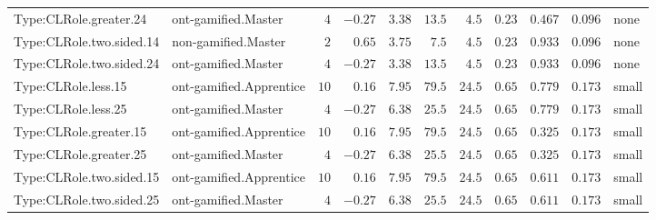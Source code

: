 \documentclass[6pt,a4paper]{article}
\begin{document}
{\begin{longtable}{llrrrrrrrrl}
Type:CLRole.greater.24&ont-gamified.Master&$ 4$&$-0.27$&$ 3.38$&$ 13.5$&$ 4.5$&$0.23$&$0.467$&$0.096$&none\tabularnewline
Type:CLRole.two.sided.14&non-gamified.Master&$ 2$&$ 0.65$&$ 3.75$&$  7.5$&$ 4.5$&$0.23$&$0.933$&$0.096$&none\tabularnewline
Type:CLRole.two.sided.24&ont-gamified.Master&$ 4$&$-0.27$&$ 3.38$&$ 13.5$&$ 4.5$&$0.23$&$0.933$&$0.096$&none\tabularnewline
Type:CLRole.less.15&ont-gamified.Apprentice&$10$&$ 0.16$&$ 7.95$&$ 79.5$&$24.5$&$0.65$&$0.779$&$0.173$&small\tabularnewline
Type:CLRole.less.25&ont-gamified.Master&$ 4$&$-0.27$&$ 6.38$&$ 25.5$&$24.5$&$0.65$&$0.779$&$0.173$&small\tabularnewline
Type:CLRole.greater.15&ont-gamified.Apprentice&$10$&$ 0.16$&$ 7.95$&$ 79.5$&$24.5$&$0.65$&$0.325$&$0.173$&small\tabularnewline
Type:CLRole.greater.25&ont-gamified.Master&$ 4$&$-0.27$&$ 6.38$&$ 25.5$&$24.5$&$0.65$&$0.325$&$0.173$&small\tabularnewline
\newpage
Type:CLRole.two.sided.15&ont-gamified.Apprentice&$10$&$ 0.16$&$ 7.95$&$ 79.5$&$24.5$&$0.65$&$0.611$&$0.173$&small\tabularnewline
Type:CLRole.two.sided.25&ont-gamified.Master&$ 4$&$-0.27$&$ 6.38$&$ 25.5$&$24.5$&$0.65$&$0.611$&$0.173$&small\tabularnewline
\hline
\end{longtable}}
\end{document}
